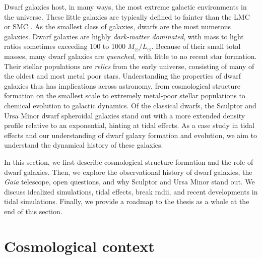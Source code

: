 Dwarf galaxies host, in many ways, the most extreme galactic
environments in the universe. These little galaxies are typically
defined to fainter than the LMC or SMC \citep[\(M_V \gtrsim -18\),
e.g.][\citet{hodge1971}]{mcconnachie2012}. As the smallest class of
galaxies, dwarfs are the most numerous galaxies. Dwarf galaxies are
highly \emph{dark-matter dominated}, with mass to light ratios sometimes
exceeding 100 to 1000 \(M_\odot/ L_\odot\). Because of their small total
masses, many dwarf galaxies are \emph{quenched}, with little to no
recent star formation. Their stellar populations are \emph{relics} from
the early universe, consisting of many of the oldest and most metal poor
stars. Understanding the properties of dwarf galaxies thus has
implications across astronomy, from cosmological structure formation on
the smallest scale to extremely metal-poor stellar populations to
chemical evolution to galactic dynamics. Of the classical dwarfs, the
Sculptor and Ursa Minor dwarf spheroidal galaxies stand out with a more
extended density profile relative to an exponential, hinting at tidal
effects. As a case study in tidal effects and our understanding of dwarf
galaxy formation and evolution, we aim to understand the dynamical
history of these galaxies.

In this section, we first describe cosmological structure formation and
the role of dwarf galaxies. Then, we explore the observational history
of dwarf galaxies, the \emph{Gaia} telescope, open questions, and why
Sculptor and Ursa Minor stand out. We discuss idealized simulations,
tidal effects, break radii, and recent developments in tidal
simulations. Finally, we provide a roadmap to the thesis as a whole at
the end of this section.

\section{Cosmological context}\label{cosmological-context}

